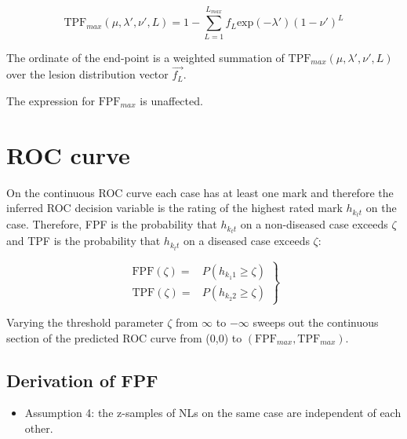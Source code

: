 \documentclass[
]{book}
\providecommand{\tightlist}{%
  \setlength{\itemsep}{0pt}\setlength{\parskip}{0pt}}
\begin{document}
\begin{equation}
\text{TPF}_{max} \left ( \mu, \lambda', \nu', L \right ) = 1 - \sum_{L=1}^{L_{max}}f_L\text{exp} \left ( - \lambda' \right ) \left ( 1 - \nu' \right )^L
\label{eq:rsm-pred-tpf-max-fl1}
\end{equation}

The ordinate of the end-point is a weighted summation of \(\text{TPF}_{max} \left ( \mu, \lambda', \nu', L \right )\) over the lesion distribution vector \(\overrightarrow{f_L}\).

The expression for \(\text{FPF}_{max}\) is unaffected.

\hypertarget{rsm-pred-roc-curve}{%
\section{ROC curve}\label{rsm-pred-roc-curve}}

On the continuous ROC curve each case has at least one mark and therefore the inferred ROC decision variable is the rating of the highest rated mark \(h_{k_t t}\) on the case. Therefore, FPF is the probability that \(h_{k_t t}\) on a non-diseased case exceeds \(\zeta\) and TPF is the probability that \(h_{k_t t}\) on a diseased case exceeds \(\zeta\):

\begin{equation}
\left. 
\begin{aligned}
\text{FPF}\left (\zeta  \right ) =& P\left ( h_{k_1 1} \geq \zeta \right )\\
\text{TPF}\left (\zeta  \right ) =& P\left ( h_{k_2 2} \geq \zeta \right )
\end{aligned}
\right \}
\label{eq:rsm-pred-tpf-fpf-zeta}
\end{equation}

Varying the threshold parameter \(\zeta\) from \(\infty\) to \(-\infty\) sweeps out the continuous section of the predicted ROC curve from (0,0) to \(\left (\text{FPF}_{max}, \text{TPF}_{max} \right )\).

\hypertarget{rsm-pred-roc-curve-fpf}{%
\subsection{Derivation of FPF}\label{rsm-pred-roc-curve-fpf}}

\begin{itemize}
\tightlist
\item
  Assumption 4: the z-samples of NLs on the same case are independent of each other.
\end{itemize}
\end{document}
